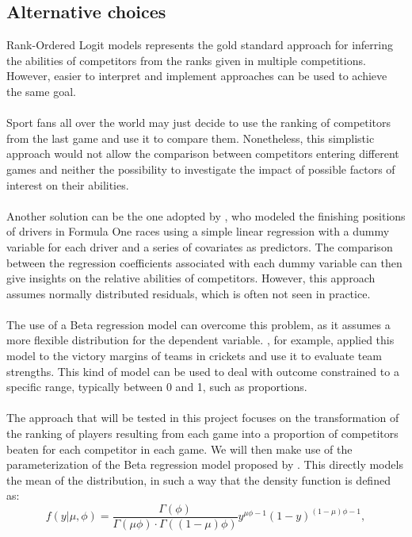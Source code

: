 \subsection{Alternative choices}
Rank-Ordered Logit models represents the gold standard approach for inferring the abilities of competitors from the ranks given in multiple competitions. However, easier to interpret and implement approaches can be used to achieve the same goal.\\ 
\\
Sport fans all over the world may just decide to use the ranking of competitors from the last game and use it to compare them. Nonetheless, this simplistic approach would not allow the comparison between competitors entering different games and neither the possibility to investigate the impact of possible factors of interest on their abilities.\\
\\
Another solution can be the one adopted by \cite{eichenberger2009best}, who modeled the finishing positions of drivers in Formula One races using a simple linear regression with a dummy variable for each driver and a series of covariates as predictors. The comparison between the regression coefficients associated with each dummy variable can then give insights on the relative abilities of competitors. However, this approach assumes normally distributed residuals, which is often not seen in practice.\\
\\
The use of  a Beta regression model can overcome this problem, as it assumes a more flexible distribution for the dependent variable. \cite{stern2008ranking}, for example, applied this model to the victory margins of teams in crickets and use it to evaluate team strengths. This kind of model can be used to deal with outcome constrained to a specific range, typically between 0 and 1, such as proportions. \\
\\
 The approach that will be tested in this project focuses on the transformation of the ranking of players resulting from each game into a proportion of competitors beaten for each competitor in each game. We will then make use of the parameterization of the Beta regression model proposed by \cite{ferrari2004beta}. This directly models the mean of the distribution, in such a way that the density function is defined as:  
\begin{equation*}
f(y|\mu, \phi) = \frac{\Gamma(\phi)}{\Gamma(\mu\phi) \cdot \Gamma((1-\mu)\phi)} y^{\mu\phi-1} (1-y)^{(1-\mu)\phi-1},
\end{equation*}
